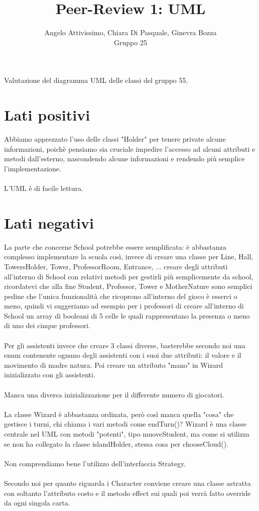 \documentclass[12pt]{article}
\title{Peer-Review 1: UML}
\author{Angelo Attivissimo, Chiara Di Pasquale, Ginevra Bozza\\Gruppo 25}
\begin{document}
\maketitle

Valutazione del diagramma UML delle classi del gruppo 55.

\section{Lati positivi}

Abbiamo apprezzato l'uso delle classi "Holder" per tenere private alcune informazioni, poichè pensiamo sia cruciale impedire l'accesso ad alcuni attributi e metodi dall'esterno, nascondendo alcune informazioni e rendendo più semplice l'implementazione.\\
\\
L'UML è di facile lettura.\\

\section{Lati negativi}

La parte che concerne School potrebbe essere semplificata: è abbastanza complesso implementare la scuola così, invece di creare una classe per Line, Hall, TowersHolder, Tower, ProfessorRoom, Entrance, ... creare degli attributi all'interno di School con relativi metodi per gestirli più semplicemente da school, ricordatevi che alla fine Student, Professor, Tower e MotherNature sono semplici pedine che l'unica funzionalità che ricoprono all'interno del gioco è esserci o meno, quindi vi suggeriamo ad esempio per i professori di creare all'interno di School un array di booleani di 5 celle le quali rappresentano la presenza o meno di uno dei cinque professori.\\
\\
Per gli assistenti invece che creare 3 classi diverse, basterebbe secondo noi una enum contenente ognuno degli assistenti con i suoi due attributi: il valore e il movimento di madre natura. Poi creare un attributo "mano" in Wizard inizializzato con gli assistenti.\\
\\
Manca una diversa inizializzazione per il differente numero di giocatori.\\
\\
La classe Wizard è abbastanza ordinata, però così manca quella "cosa" che gestisce i turni, chi chiama i vari metodi come endTurn()? Wizard è una classe centrale nel UML con metodi "potenti", tipo muoveStudent, ma come si utilizza se non ha collegato la classe islandHolder, stessa cosa per chooseCloud().\\
\\
Non comprendiamo bene l'utilizzo dell'interfaccia Strategy.\\
\\
Secondo noi per quanto riguarda i Character conviene creare una classe astratta con soltanto l'attributo costo e il metodo effect sui quali poi verrà fatto override da ogni singola carta.
\end{document}
